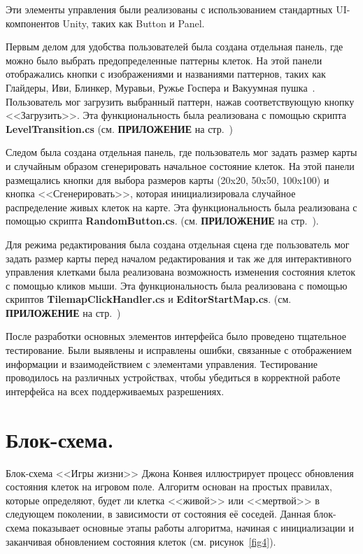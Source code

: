 Эти элементы управления были реализованы с использованием стандартных UI-компонентов Unity, таких как Button и Panel.

Первым делом для удобства пользователей была создана отдельная панель, где можно было выбрать предопределенные паттерны клеток. На этой панели отображались кнопки с изображениями и названиями паттернов, таких как Глайдеры, Иви, Блинкер, Муравьи, Ружье Госпера и Вакуумная пушка~\cite{pattern}. Пользователь мог загрузить выбранный паттерн, нажав соответствующую кнопку <<Загрузить>>. Эта функциональность была реализована с помощью скрипта \textbf{LevelTransition.cs} (см. \textbf{\textsc{ПРИЛОЖЕНИЕ}} на стр.~\pageref{code:lvl})

Следом была создана отдельная панель, где пользователь мог задать размер карты и случайным образом сгенерировать начальное состояние клеток. На этой панели размещались кнопки для выбора размеров карты (20x20, 50x50, 100x100) и кнопка <<Сгенерировать>>, которая инициализировала случайное распределение живых клеток на карте. Эта функциональность была реализована с помощью скрипта \textbf{RandomButton.cs}. (см. \textbf{\textsc{ПРИЛОЖЕНИЕ}} на стр.~\pageref{code:rndB}). 

Для режима редактирования была создана отдельная сцена где пользователь мог задать размер карты перед началом редактирования и так же для интерактивного управления клетками была реализована возможность изменения состояния клеток с помощью кликов мыши. Эта функциональность была реализована с помощью скриптов \textbf{TilemapClickHandler.cs} и \textbf{EditorStartMap.cs}. (см. \textbf{\textsc{ПРИЛОЖЕНИЕ}} на стр.~\pageref{code:strMap})

После разработки основных элементов интерфейса было проведено тщательное тестирование. Были выявлены и исправлены ошибки, связанные с отображением информации и взаимодействием с элементами управления. Тестирование проводилось на различных устройствах, чтобы убедиться в корректной работе интерфейса на всех поддерживаемых разрешениях.


\section{\label{sec:ch02/sec01/sub04}Блок-схема.}

Блок-схема <<Игры жизни>> Джона Конвея иллюстрирует процесс обновления состояния клеток на игровом поле. Алгоритм основан на простых правилах, которые определяют, будет ли клетка <<живой>> или <<мертвой>> в следующем поколении, в зависимости от состояния её соседей. Данная блок-схема показывает основные этапы работы алгоритма, начиная с инициализации и заканчивая обновлением состояния клеток (см. рисунок~\ref{fig4}). 


